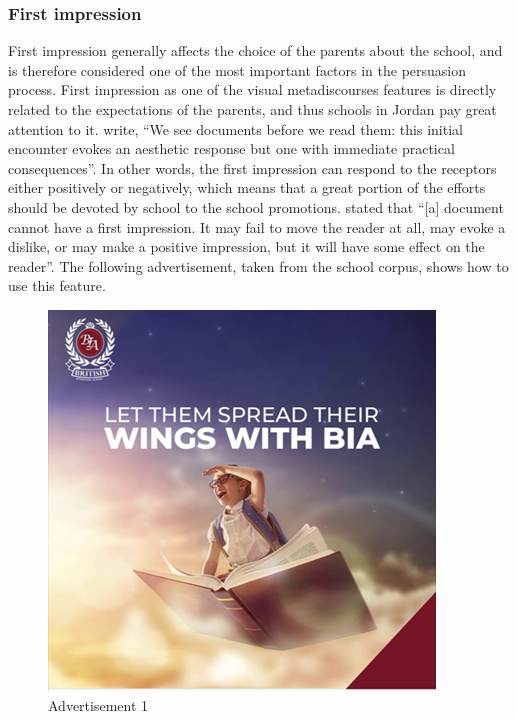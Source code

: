 \documentclass[english]{textolivre}
\begin{document}
\subsubsection{First impression}\label{sec-modelo}
First impression generally affects the choice of the parents about the school, and is therefore considered one of the most important factors in the persuasion process. First impression as one of the visual metadiscourses features is directly related to the expectations of the parents, and thus schools in Jordan pay great attention to it. \textcite[p.318]{kostenlnick_designing_1998} write, “We see documents before we read them: this initial encounter evokes an aesthetic response but one with immediate practical consequences”. In other words, the first impression can respond to the receptors either positively or negatively, which means that a great portion of the efforts should be devoted by school to the school promotions. \textcite[p.~406]{kumpf_visual_2000} stated that “[a] document cannot have a first impression. It may fail to move the reader at all, may evoke a dislike, or may make a positive impression, but it will have some effect on the reader”. The following advertisement, taken from the school corpus, shows how to use this feature.

\begin{figure}[htbp]
\centering
\begin{minipage}{0.5\textwidth}
\includegraphics[width=\linewidth]{Fig1.png}
\caption{Advertisement 1}
\label{fig1}
\end{minipage}
\end{figure}
\end{document}
